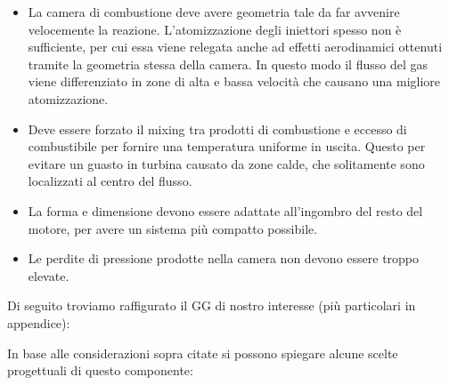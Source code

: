 \documentclass[11pt,a4paper,twocolumn]{article}
\newcommand{\figura}[3]{
\begin{figure}[H]
	\centering
	\texttt{[image: \#1]}
	\caption{#2}
	\label{fig:#3}
\end{figure}
}
\begin{document}
\begin{itemize}[wide,itemsep=3pt,topsep=3pt]

\item
La camera di combustione deve avere geometria tale da far avvenire velocemente la reazione. L’atomizzazione degli iniettori spesso non è sufficiente, per cui essa viene relegata anche ad effetti aerodinamici ottenuti tramite la geometria stessa della camera. In questo modo il flusso del gas viene differenziato in zone di alta e bassa velocità che causano una migliore atomizzazione.
\item
Deve essere forzato il mixing tra prodotti di combustione e eccesso di combustibile per fornire una temperatura uniforme in uscita. Questo per evitare un guasto in turbina causato da zone calde, che solitamente sono localizzati al centro del flusso. 
\item
La forma e dimensione devono essere adattate all'ingombro del resto del motore, per avere un sistema più compatto possibile.
\item
Le perdite di pressione prodotte nella camera non devono essere troppo elevate. 

\end{itemize}

Di seguito troviamo raffigurato il GG di nostro interesse (più particolari in appendice):


In base alle considerazioni sopra citate si possono spiegare alcune scelte progettuali di questo componente:
\end{document}
